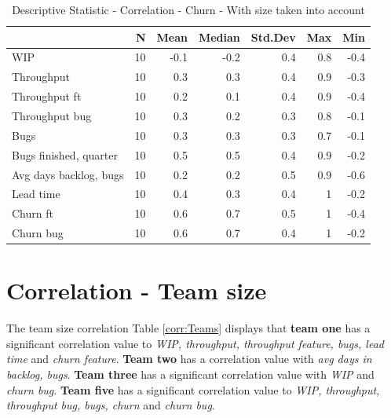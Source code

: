 \documentclass[UKenglish]{ifimaster}  %
\begin{document}
\begin{table}[!htbp]
 \centering
 \begin{tabular}{ | l | r | r | r | r | r | r | }
 \hline
& \bf{N} & \bf{Mean} & \bf{Median} & \bf{Std.Dev} & \bf{Max} & \bf{Min} \\ \hline
WIP  & 10 & -0.1 & -0.2 & 0.4 & 0.8 & -0.4\\ \hline
Throughput  & 10 & 0.3 & 0.3 & 0.4 & 0.9 & -0.3\\ \hline
Throughput ft  & 10 & 0.2 & 0.1 & 0.4 & 0.9 & -0.4\\ \hline
Throughput bug  & 10 & 0.3 & 0.2 & 0.3 & 0.8 & -0.1\\ \hline
Bugs  & 10 & 0.3 & 0.3 & 0.3 & 0.7 & -0.1\\ \hline
Bugs finished, quarter  & 10 & 0.5 & 0.5 & 0.4 & 0.9 & -0.2\\ \hline
Avg days backlog, bugs  & 10 & 0.2 & 0.2 & 0.5 & 0.9 & -0.6\\ \hline
Lead time & 10 & 0.4 & 0.3 & 0.4 & 1 & -0.2\\ \hline
Churn ft  & 10 & 0.6 & 0.7 & 0.5 & 1 & -0.4\\ \hline
Churn bug  & 10 & 0.6 & 0.7 & 0.4 & 1 & -0.2\\ \hline

\end{tabular}
 \caption{Descriptive Statistic - Correlation - Churn - With size taken into account}
 \label{DS:corr:churn:v2}
 \end{table}
 
 
 \section{Correlation - Team size}
 \label{sec:corr:tz}
 The team size correlation Table \ref{corr:Teams} displays that \textbf{team one} has a significant correlation value to \textit{WIP, throughput, throughput feature, bugs, lead time} and \textit{churn feature}. \textbf{Team two} has a correlation value with \textit{avg days in backlog, bugs}. \textbf{Team three} has a significant correlation value with \textit{WIP} and \textit{churn bug}. \textbf{Team five} has a significant correlation value to \textit{WIP, throughput, throughput bug, bugs, churn} and \textit{churn bug}.
\end{document}
